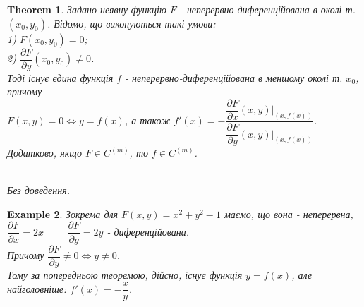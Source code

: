 \documentclass[a4paper, 10pt]{article}
\def\departial#1#2{\dfrac{\partial {#1}}{\partial {#2}}}
\theoremstyle{theoremdd}
\newtheorem{theorem}{Theorem}[subsection]
\theoremstyle{theoremdd}
\theoremstyle{theoremdd}
\theoremstyle{theoremdd}
\theoremstyle{theoremdd}
\newtheorem{example}[theorem]{Example}
\theoremstyle{theoremdd}
\theoremstyle{theoremdd}
\theoremstyle{theoremdd}
\theoremstyle{theoremdd}
\begin{document}
\begin{theorem}
Задано неявну функцію $F$ - неперервно-диференційована в околі т. $(x_0,y_0)$. Відомо, що виконуються такі умови:\\
1) $F(x_0,y_0)=0$;\\
2) $\departial{F}{y}(x_0,y_0) \neq 0$.\\
Тоді існує єдина функція $f$ - неперервно-диференційована в меншому околі т. $x_0$, причому \\ $F(x,y) = 0 \iff y = f(x)$, а також $f'(x) = -\dfrac{\departial{F}{x}(x,y) \Big|_{(x,f(x))}}{\departial{F}{y}(x,y) \Big|_{(x,f(x))}}$.
\bigskip \\
Додатково, якщо $F \in C^{(m)}$, то $f \in C^{(m)}$.
\iffalse
Тоді справедливо наступне:\\
I) $\exists \delta_1,\delta_2 > 0: (x_0-\delta_1,x_0+\delta_1) \times (y_0-\delta_2,y_0+\delta_2) \subset U(x_0,y_0)$\\
II) $\exists f: (x_0-\delta_1,x_0+\delta_1) \to (y_0-\delta_2,y_0+\delta_2)$, така, що \\ $f \in C^{(m)}((x_0-\delta_1,x_0+\delta_1))$ та\\
$(x,y) \in (x_0-\delta_1,x_0+\delta_1) \times (y_0-\delta_2,y_0+\delta_2) \iff \begin{cases} x \in (x_0-\delta_1,x_0+\delta_1) \\ y \in (y_0-\delta_2,y_0+\delta_2) \end{cases}$\\
III) $F(x,y) = 0 \iff y=f(x)$\\
IV) $f'(x) = -\dfrac{\departial{F}{x}(x,y) \Big|_{(x,f(x))}}{\departial{F}{y}(x,y) \Big|_{(x,f(x))}}$\\
\textit{Без доведення. Можна подивитись у Зоріча зі 20 сторінками}
\fi
\\
\textit{Без доведення.}
\end{theorem}

\begin{example}
Зокрема для $F(x,y) = x^2+y^2-1$ маємо, що вона - неперервна,\\
$\departial{F}{x} = 2x \hspace{1cm} \departial{F}{y} = 2y$ - диференційована.\\
Причому $\departial{F}{y} \neq 0 \iff y \neq 0$.\\
Тому за попередньою теоремою, дійсно, існує функція $y = f(x)$, але найголовніше: $f'(x) = -\dfrac{x}{y}$.
\end{example}
\end{document}
